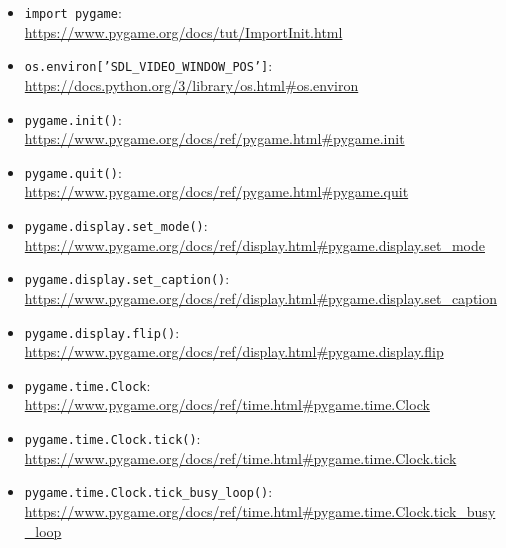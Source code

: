 \begin{itemize}
\item \texttt{import pygame}:\\ \url{https://www.pygame.org/docs/tut/ImportInit.html}

\item \texttt{os.environ['SDL\_VIDEO\_WINDOW\_POS']}:\\
\url{https://docs.python.org/3/library/os.html#os.environ}

\item \texttt{pygame.init()}:
\\
\url{https://www.pygame.org/docs/ref/pygame.html#pygame.init}

\item \texttt{pygame.quit()}:
\\
\url{https://www.pygame.org/docs/ref/pygame.html#pygame.quit}

\item \texttt{pygame.display.set\_mode()}:
\\
\url{https://www.pygame.org/docs/ref/display.html#pygame.display.set_mode}

\item \texttt{pygame.display.set\_caption()}:
\\
\url{https://www.pygame.org/docs/ref/display.html#pygame.display.set_caption}

\item \texttt{pygame.display.flip()}:
\\
\url{https://www.pygame.org/docs/ref/display.html#pygame.display.flip}

\item \texttt{pygame.time.Clock}:
\\
\url{https://www.pygame.org/docs/ref/time.html#pygame.time.Clock}

\item \texttt{pygame.time.Clock.tick()}:
\\
\url{https://www.pygame.org/docs/ref/time.html#pygame.time.Clock.tick}

\item \texttt{pygame.time.Clock.tick\_busy\_loop()}:
\\
\url{https://www.pygame.org/docs/ref/time.html#pygame.time.Clock.tick_busy_loop}


\end{itemize}
